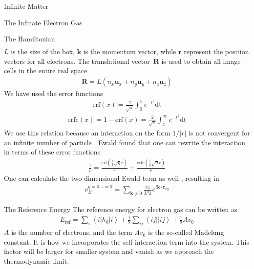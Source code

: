 \documentclass[twoside,english]{uiofysmaster}
\begin{document}
\begin{chapter}{Infinite Matter}
\begin{section}{The Infinate Electron Gas}
\begin{subsection}{The Hamiltonian}
\begin{align}
			\end{align}
			$L$ is the size of the box, $\mathbf{k}$ is the momentum vector, while $\mathbf{r}$ represent the position vectors for all electrons. The translational vector $\mathbf{R}$ is used to obtain all image cells in the entire real space \cite{MHJonline}
			\begin{align}
				\mathbf{R} = L(n_x \mathbf{u}_x + n_y \mathbf{u}_y + n_z \mathbf{u}_z)
			\end{align}
			We have used the error functions
			\begin{align}
				\text{erf}(x) = \frac{2}{\sqrt{\pi}} \int_0^x e^{-t^2} \text{dt}
			\end{align}
			\begin{align}
				\text{erfc}(x) = 1 - \text{erf}(x) = \frac{2}{\sqrt{\pi}} \int_x^\infty e^{-t^2} \text{dt}
			\end{align}
			We use this relation because an interaction on the form $1/|r|$ is not convergent for an infinite number of particle \cite{Audun}. Ewald found that one can rewrite the interaction in terms of these error functions \cite{Ewald}
			\begin{align}
				\frac{1}{r} = \frac{\text{erf}(\frac{1}{2}\sqrt{\eta}r)}{r} + \frac{\text{erfc}(\frac{1}{2}\sqrt{\eta}r)}{r}
			\end{align}
			One can calculate the two-dimensional Ewald term as well \cite{Baardsen}, resulting in 
			\begin{align}
				v_E^{\eta=0, z=0} = \sum_{\mathbf{k} \neq 0} \frac{2 \pi}{L^2 k} e^{i \mathbf{k} \cdot \mathbf{r}_{xy}}
			\end{align}
		\end{subsection}
		
		\begin{subsection}{The Reference Energy}
			The reference energy for electron gas can be written as \cite{Baardsen}
			\begin{align}
				E_{\text{ref}} = \sum_i \left<i | h_0 | i\right> + \frac{1}{2} \sum_{ij} \left<ij||ij\right> + \frac{1}{2} Av_0
			\end{align}
			$A$ is the number of electrons, and the term $A v_0$ is the so-called Madelung constant. It is how we incorporates the self-interaction term into the system. This factor will be larger for smaller system and vanish as we approach the thermodynamic limit. 
		\end{subsection}
		

\end{section}
\end{chapter}
\end{document}
